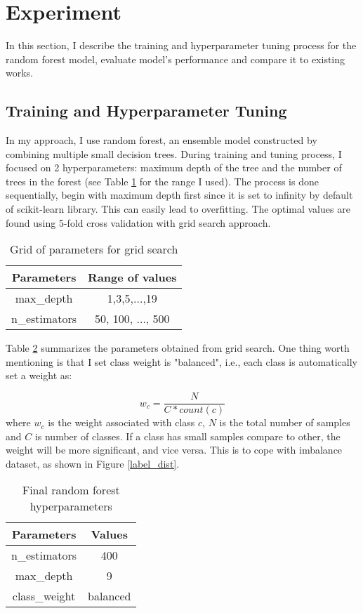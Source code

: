 \documentclass[conference]{IEEEtran}
\begin{document}
	
	
	\section{Experiment}
	In this section, I describe the training and hyperparameter tuning process for the random forest model, evaluate model's performance and compare it to existing works. 
	\subsection{Training and Hyperparameter Tuning}
	In my approach, I use random forest, an ensemble model constructed by combining multiple small decision trees. During training and tuning process, I focused on 2 hyperparameters: maximum depth of the tree and the number of trees in the forest (see Table \ref{param_grid} for the range I used). The process is done sequentially, begin with maximum depth first since it is set to infinity by default of scikit-learn library. This can easily lead to overfitting. The optimal values are found using 5-fold cross validation with grid search approach. 
	
	\begin{table}[h]
		\centering
		\caption{Grid of parameters for grid search}
		\label{param_grid}
		\begin{tabular}{|c|c|}
			\hline
			Parameters & Range of values \\ 
			\hline 
			max\_depth & 1,3,5,...,19 \\ 
			n\_estimators & 50, 100, ..., 500 \\
			\hline 		
		\end{tabular}
	\end{table}
	
	Table \ref{tab:param} summarizes the parameters obtained from grid search. One thing worth mentioning is that I set class weight is "balanced", i.e., each class is automatically set a weight as: 
	
	\[ w_c = \frac{N}{C * count(c)} \]
	where $w_c$ is the weight associated with class $c$, $N$ is the total number of samples and $C$ is number of classes. If a class has small samples compare to other, the weight will be more significant, and vice versa. This is to cope with imbalance dataset, as shown in Figure \ref{label_dist}. 
	
	\begin{table}[h]
		\centering
		\caption{Final random forest hyperparameters}
		\label{tab:param}
		\begin{tabular}{|c|c|}
			\hline
			Parameters & Values\\
			\hline
			n\_estimators & 400 \\ 
			max\_depth & 9 \\ 
			class\_weight & balanced \\
			\hline 
		\end{tabular}
	\end{table}
	
\end{document}
